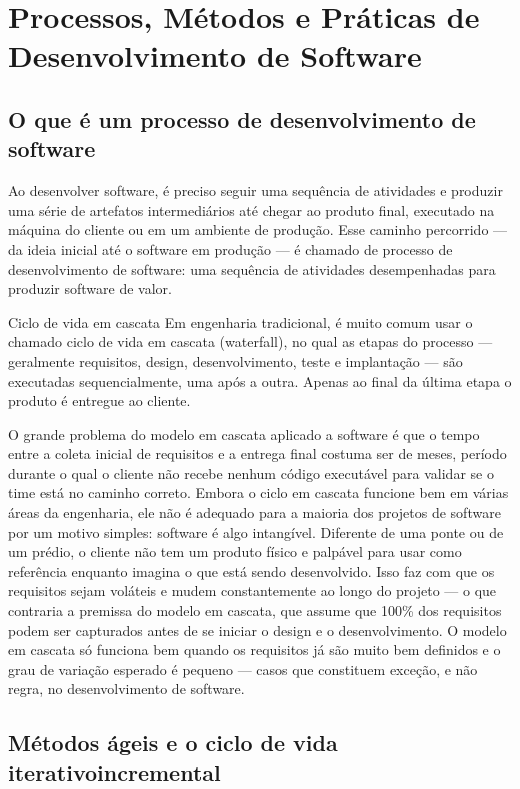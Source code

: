 \chapter{Processos, Métodos e Práticas de Desenvolvimento de Software}

\section{O que é um processo de desenvolvimento de software}

Ao desenvolver software, é preciso seguir uma sequência de atividades e produzir uma série de artefatos intermediários até chegar ao produto final, executado na máquina do cliente ou em um ambiente de produção. Esse caminho percorrido — da ideia inicial até o software em produção — é chamado de processo de desenvolvimento de software: uma sequência de atividades desempenhadas para produzir software de valor.

\begin{infobox}{Ciclo de vida em cascata}
Em engenharia tradicional, é muito comum usar o chamado ciclo de vida em cascata (waterfall), no qual as etapas do processo — geralmente requisitos, design, desenvolvimento, teste e implantação — são executadas sequencialmente, uma após a outra. Apenas ao final da última etapa o produto é entregue ao cliente.
\end{infobox}

O grande problema do modelo em cascata aplicado a software é que o tempo entre a coleta inicial de requisitos e a entrega final costuma ser de meses, período durante o qual o cliente não recebe nenhum código executável para validar se o time está no caminho correto. Embora o ciclo em cascata funcione bem em várias áreas da engenharia, ele não é adequado para a maioria dos projetos de software por um motivo simples: software é algo intangível. Diferente de uma ponte ou de um prédio, o cliente não tem um produto físico e palpável para usar como referência enquanto imagina o que está sendo desenvolvido. Isso faz com que os requisitos sejam voláteis e mudem constantemente ao longo do projeto — o que contraria a premissa do modelo em cascata, que assume que 100\% dos requisitos podem ser capturados antes de se iniciar o design e o desenvolvimento. O modelo em cascata só funciona bem quando os requisitos já são muito bem definidos e o grau de variação esperado é pequeno — casos que constituem exceção, e não regra, no desenvolvimento de software.

\section{Métodos ágeis e o ciclo de vida iterativoincremental}

